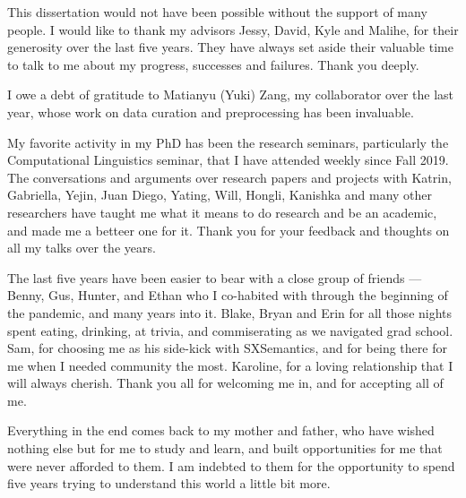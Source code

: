 \begin{acknowledgments}		%
    This dissertation would not have been possible without the support of many people. I would like to thank my advisors Jessy, David, Kyle and Malihe, for their generosity over the last five years. They have always set aside their valuable time to talk to me about my progress, successes and failures. Thank you deeply.
    
    I owe a debt of gratitude to Matianyu (Yuki) Zang, my collaborator over the last year, whose work on data curation and preprocessing has been invaluable. 
    
    My favorite activity in my PhD has been the research seminars, particularly the Computational Linguistics seminar, that I have attended weekly since Fall 2019. The conversations and arguments over research papers and projects with Katrin, Gabriella, Yejin, Juan Diego, Yating, Will, Hongli, Kanishka and many other researchers have taught me what it means to do research and be an academic, and made me a betteer one for it. Thank you for your feedback and thoughts on all my talks over the years.
    
    The last five years have been easier to bear with a close group of friends --- Benny, Gus, Hunter, and Ethan who I co-habited with through the beginning of the pandemic, and many years into it. Blake, Bryan and Erin for all those nights spent eating, drinking, at trivia, and commiserating as we navigated grad school. Sam, for choosing me as his side-kick with SXSemantics, and for being there for me when I needed community the most. Karoline, for a loving relationship that I will always cherish. Thank you all for welcoming me in, and for accepting all of me.
    
    Everything in the end comes back to my mother and father, who have wished nothing else but for me to study and learn, and built opportunities for me that were never afforded to them. I am indebted to them for the opportunity to spend five years trying to understand this world a little bit more.
\end{acknowledgments}

%
\utabstract

